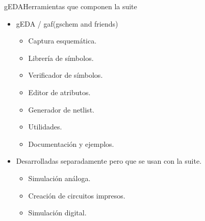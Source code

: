 \message{ !name(alternativa.tex)}\documentclass{beamer}
\begin{document}
\begin{frame}{gEDA}{Herramientas que componen la suite}
  \begin{itemize}
  \item gEDA / gaf(gschem and friends)
      \begin{itemize}
      \item Captura esquemática.
      \item Librería de símbolos.
      \item Verificador de símbolos.
      \item Editor de atributos.
      \item Generador de netlist.
      \item Utilidades.
      \item Documentación y ejemplos.
      \end{itemize}
    \item Desarrolladas separadamente pero que se usan con la suite.
      \begin{itemize}
      \item Simulación análoga.
      \item Creación de circuitos impresos.
      \item Simulación digital.
      \end{itemize}
  \end{itemize}
\end{frame}



\end{document}
